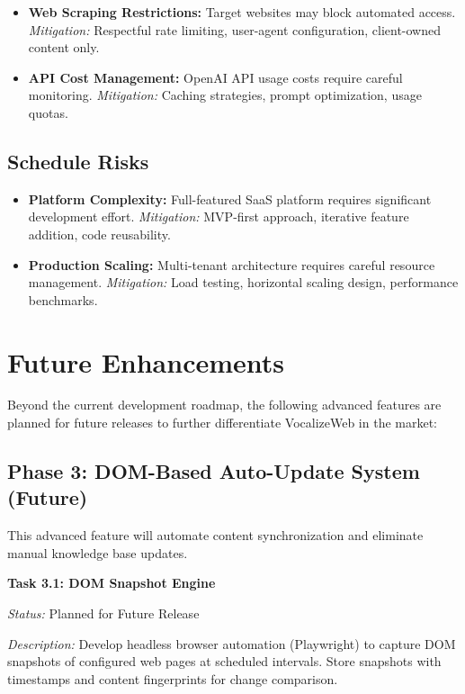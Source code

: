 \begin{itemize}[leftmargin=*]
    \item \textbf{Web Scraping Restrictions:} Target websites may block automated access. \textit{Mitigation:} Respectful rate limiting, user-agent configuration, client-owned content only.
    \item \textbf{API Cost Management:} OpenAI API usage costs require careful monitoring. \textit{Mitigation:} Caching strategies, prompt optimization, usage quotas.
\end{itemize}

\subsection{Schedule Risks}

\begin{itemize}[leftmargin=*]
    \item \textbf{Platform Complexity:} Full-featured SaaS platform requires significant development effort. \textit{Mitigation:} MVP-first approach, iterative feature addition, code reusability.
    \item \textbf{Production Scaling:} Multi-tenant architecture requires careful resource management. \textit{Mitigation:} Load testing, horizontal scaling design, performance benchmarks.
\end{itemize}

\section{Future Enhancements}

Beyond the current development roadmap, the following advanced features are planned for future releases to further differentiate VocalizeWeb in the market:

\subsection{Phase 3: DOM-Based Auto-Update System (Future)}

This advanced feature will automate content synchronization and eliminate manual knowledge base updates.

\vspace{0.3cm}

\textbf{Task 3.1: DOM Snapshot Engine}

\textit{Status:} Planned for Future Release

\textit{Description:} Develop headless browser automation (Playwright) to capture DOM snapshots of configured web pages at scheduled intervals. Store snapshots with timestamps and content fingerprints for change comparison.

